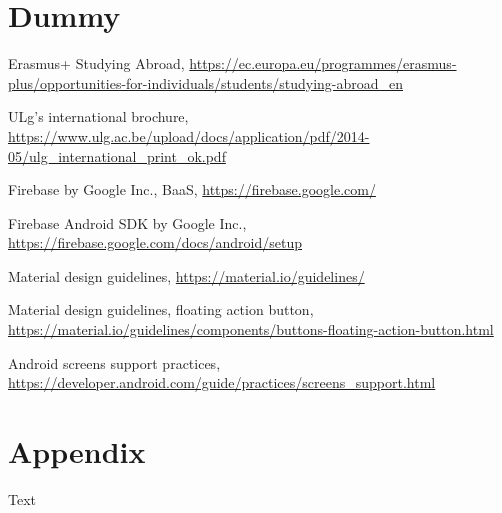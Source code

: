 \documentclass[runningheads,a4paper]{llncs}
\begin{document}
\section{Dummy}

\begin{thebibliography}{4}
	 Erasmus+ Studying Abroad, \url{https://ec.europa.eu/programmes/erasmus-plus/opportunities-for-individuals/students/studying-abroad_en}
	
	 ULg's international brochure, \url{https://www.ulg.ac.be/upload/docs/application/pdf/2014-05/ulg_international_print_ok.pdf}
	
	 Firebase by Google Inc., BaaS, \url{https://firebase.google.com/}
	
	 Firebase Android SDK by Google Inc., \url{https://firebase.google.com/docs/android/setup}
	
	 Material design guidelines, \url{https://material.io/guidelines/}
	
	 Material design guidelines, floating action button, \url{https://material.io/guidelines/components/buttons-floating-action-button.html}
	
	 Android screens support practices, \url{https://developer.android.com/guide/practices/screens_support.html}
\end{thebibliography}


\section*{Appendix}
Text
\end{document}
